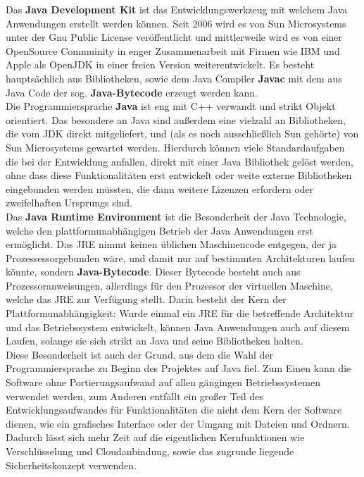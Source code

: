 \documentclass[12pt,a4paper,bibliography=totocnumbered,listof=totocnumbered]{scrartcl}
\begin{document}
Das \textbf{Java Development Kit} ist das Entwicklungswerkzeug mit welchem Java Anwendungen erstellt werden können. Seit 2006 wird es von Sun Microsystems unter der Gnu Public License veröffentlicht und mittlerweile wird es von einer OpenSource Commuinity in enger Zusammenarbeit mit Firmen wie IBM und Apple als OpenJDK in einer freien Version weiterentwickelt. Es besteht hauptsächlich aus Bibliotheken, sowie dem Java Compiler \textbf{Javac} mit dem aus Java Code der sog. \textbf{Java-Bytecode} erzeugt werden kann.\\
Die Programmiersprache \textbf{Java} ist eng mit C++ verwandt und strikt Objekt orientiert. Das besondere an Java sind außerdem eine vielzahl an Bibliotheken, die vom JDK direkt mitgeliefert, und (als es noch ausschließlich Sun gehörte) von Sun Microsystems gewartet werden. Hierdurch können viele Standardaufgaben die bei der Entwicklung anfallen, direkt mit einer Java Bibliothek gelöst werden, ohne dass diese Funktionalitäten erst entwickelt oder weite externe Bibliotheken eingebunden werden müssten, die dann weitere Lizenzen erfordern oder zweifelhaften Ursprungs sind.\\
Das \textbf{Java Runtime Environment} ist die Besonderheit der Java Technologie, welche den plattformunabhängigen Betrieb der Java Anwendungen erst ermöglicht. Das  JRE nimmt keinen üblichen Maschinencode entgegen, der ja Prozessessorgebunden wäre, und damit nur auf bestimmten Architekturen laufen könnte, sondern \textbf{Java-Bytecode}. Dieser Bytecode besteht auch aus Prozessoranweisungen, allerdings für den Prozessor der virtuellen Maschine, welche das JRE zur Verfügung stellt. Darin besteht der Kern der Plattformunabhängigkeit: Wurde einmal ein JRE für die betreffende Architektur und das Betriebssystem entwickelt, können Java Anwendungen auch auf diesem Laufen, solange sie sich strikt an Java und seine Bibliotheken halten.\\
Diese Besonderheit ist auch der Grund, aus dem die Wahl der Programmiersprache zu Beginn des Projektes auf Java fiel. Zum Einen kann die Software ohne Portierungsaufwand auf allen gängingen Betriebssystemen verwendet werden, zum Anderen entfällt ein großer Teil des Entwicklungsaufwandes für Funktionalitäten die nicht dem Kern der Software dienen, wie ein grafisches Interface oder der Umgang mit Dateien und Ordnern. Dadurch lässt sich mehr Zeit auf die eigentlichen Kernfunktionen wie Verschlüsselung und Cloudanbindung,  sowie das zugrunde liegende Sicherheitskonzept verwenden.
\cite{Oracle}\cite{WikiJava}\cite{WikiJavaTechnology}
\end{document}
